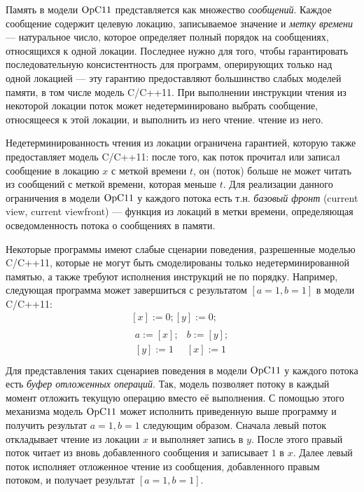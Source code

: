 Память в модели $\mathrm{OpC11}$ представляется как множество \emph{сообщений}. Каждое сообщение содержит целевую локацию, записываемое значение и
\emph{метку времени} --- натуральное число, которое определяет полный порядок на сообщениях, относящихся к одной локации.
Последнее нужно для того, чтобы гарантировать последовательную консистентность для программ, оперирующих только над одной локацией --- эту гарантию
предоставляют большинство слабых моделей памяти, в том числе модель C/C++11.
При выполнении инструкции чтения из некоторой локации поток может недетерминировано выбрать сообщение, относящееся к этой локации, и выполнить из него чтение.
чтение из него.


Недетерминированность чтения из локации ограничена гарантией, которую также предоставляет модель C/C++11:
после того, как поток прочитал или записал сообщение в локацию $x$ с меткой времени $t$, он (поток) больше не может читать из сообщений
с меткой времени, которая меньше $t$. Для реализации данного ограничения в модели $\mathrm{OpC11}$ у каждого потока есть т.н. \emph{базовый фронт}
(current view, current viewfront) --- функция из локаций в метки времени, определяющая осведомленность потока о сообщениях в памяти.

Некоторые программы имеют слабые сценарии поведения, разрешенные моделью C/C++11, которые не могут быть смоделированы только недетерминированной
памятью, а также требуют исполнения инструкций не по порядку. Например, следующая программа может завершиться с
результатом $[a = 1, b = 1]$ в модели C/C++11:
\[
\begin{array}{c}
[x] := 0; [y] := 0; \\
\begin{array}{l||l}
  {} a := [x]; & b := [y]; \\
  {} [y] := 1 & [x] := 1 \\
\end{array}
\end{array}
\]
Для представления таких сценариев поведения в модели $\mathrm{OpC11}$ у каждого потока есть \emph{буфер отложенных операций}. Так, модель
позволяет потоку в каждый момент отложить текущую операцию вместо её выполнения.
С помощью этого механизма модель $\mathrm{OpC11}$ может исполнить приведенную выше программу и получить результат $a = 1, b = 1$ следующим образом.
Сначала левый поток откладывает чтение из локации $x$ и выполняет запись в $y$. После этого правый поток читает из вновь добавленного
сообщения и записывает $1$ в $x$. Далее левый поток исполняет отложенное чтение из сообщения, добавленного правым потоком, и получает
результат $[a = 1, b = 1]$.

